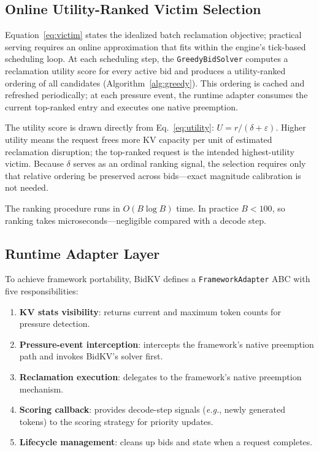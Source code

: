 \documentclass[sigconf,nonacm]{acmart}
\newcommand{\bidkv}{BidKV\xspace}
\newcommand{\utilfn}{\ensuremath{U}}
\newcommand{\tokfree}{\ensuremath{r}}
\newcommand{\qualdelta}{\ensuremath{\delta}}
\newcommand{\stabeps}{\ensuremath{\varepsilon}}
\newcommand{\numbids}{\ensuremath{B}}
\newcommand{\eg}{\emph{e.g.},\xspace}
\begin{document}
\subsection{Online Utility-Ranked Victim Selection}\label{sec:design:solver}

Equation~\ref{eq:victim} states the idealized batch reclamation objective;
practical serving requires an online approximation that fits within the
engine's tick-based scheduling loop.  At each scheduling step, the
\texttt{GreedyBidSolver} computes a reclamation utility score for every
active bid and produces a utility-ranked ordering of all candidates
(Algorithm~\ref{alg:greedy}).  This ordering is cached and refreshed
periodically; at each pressure event, the runtime adapter consumes the
current top-ranked entry and executes one native preemption.



The utility score is drawn directly from Eq.~\ref{eq:utility}:
$\utilfn = \tokfree / (\qualdelta + \stabeps)$.  Higher utility means the
request frees more KV capacity per unit of estimated reclamation disruption;
the top-ranked request is the intended highest-utility victim.
Because $\qualdelta$ serves as an ordinal ranking signal, the selection
requires only that relative ordering be preserved across bids---exact
magnitude calibration is not needed.

The ranking procedure runs in $O(\numbids \log \numbids)$ time.  In practice
$\numbids < 100$, so ranking takes microseconds---negligible compared with a
decode step.

\subsection{Runtime Adapter Layer}\label{sec:design:adapter}

To achieve framework portability, \bidkv defines a
\texttt{Framework\-Adapter} ABC with five responsibilities:

\begin{enumerate}[nosep]
\item \textbf{KV stats visibility}: returns current and maximum token counts
  for pressure detection.
\item \textbf{Pressure-event interception}: intercepts the framework's
  native preemption path and invokes \bidkv's solver first.
\item \textbf{Reclamation execution}: delegates to the framework's
  native preemption mechanism.
\item \textbf{Scoring callback}: provides decode-step signals (\eg newly
  generated tokens) to the scoring strategy for priority updates.
\item \textbf{Lifecycle management}: cleans up bids and state when a request
  completes.
\end{enumerate}
\end{document}
